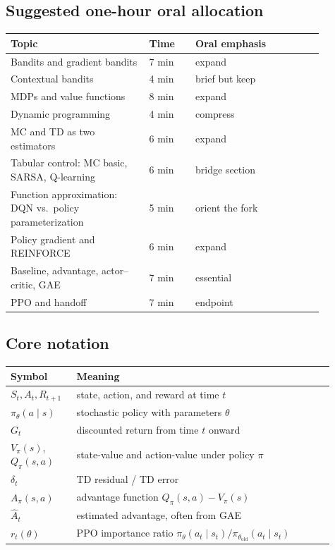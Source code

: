 \documentclass[11pt]{article}
\newcommand{\1}{\mathbf{1}}
\begin{document}
\subsection*{Suggested one-hour oral allocation}

\begin{center}
\begin{tabular}{p{0.39\linewidth}p{0.13\linewidth}p{0.36\linewidth}}
\toprule
Topic & Time & Oral emphasis \\
\midrule
Bandits and gradient bandits & 7 min & expand \\
Contextual bandits & 4 min & brief but keep \\
MDPs and value functions & 8 min & expand \\
Dynamic programming & 4 min & compress \\
MC and TD as two estimators & 6 min & expand \\
Tabular control: MC basic, SARSA, Q-learning & 6 min & bridge section \\
Function approximation: DQN vs.~policy parameterization & 5 min & orient the fork \\
Policy gradient and REINFORCE & 6 min & expand \\
Baseline, advantage, actor--critic, GAE & 7 min & essential \\
PPO and handoff & 7 min & endpoint \\
\bottomrule
\end{tabular}
\end{center}

\subsection*{Core notation}

\begin{center}
\begin{tabular}{>{\raggedright\arraybackslash}p{0.18\linewidth} >{\raggedright\arraybackslash}p{0.73\linewidth}}
\toprule
Symbol & Meaning \\
\midrule
$S_t, A_t, R_{t+1}$ & state, action, and reward at time $t$ \\
$\pi_\theta(a\mid s)$ & stochastic policy with parameters $\theta$ \\
$G_t$ & discounted return from time $t$ onward \\
$V_\pi(s)$, $Q_\pi(s,a)$ & state-value and action-value under policy $\pi$ \\
$\delta_t$ & TD residual / TD error \\
$A_\pi(s,a)$ & advantage function $Q_\pi(s,a)-V_\pi(s)$ \\
$\hat A_t$ & estimated advantage, often from GAE \\
$r_t(\theta)$ & PPO importance ratio $\pi_\theta(a_t\mid s_t)/\pi_{\theta_{\mathrm{old}}}(a_t\mid s_t)$ \\
\bottomrule
\end{tabular}
\end{center}
\end{document}
